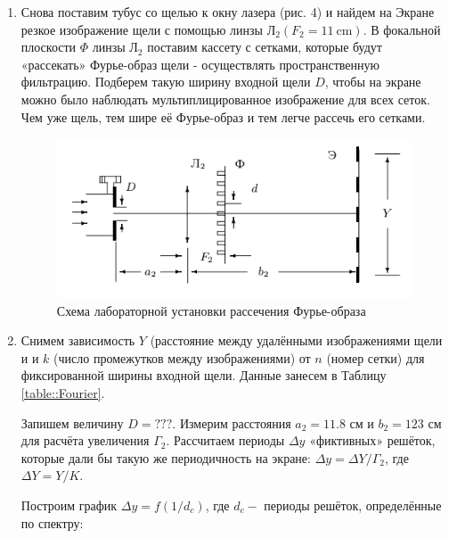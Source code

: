 \documentclass[a4paper, 12pt]{article}
\begin{document}
\begin{enumerate}
    \item Снова поставим тубус со щелью к окну лазера (рис. 4) и найдем на Экране резкое изображение щели с помощью линзы Л$_{2}\left(F_{2} = 11 \mathrm{~cm}\right) .$ В фокальной плоскости $\Phi$ линзы Л$_{2}$ поставим кассету с сетками, которые будут «рассекать» Фурье-образ щели - осуществлять пространственную фильтрацию. Подберем такую ширину входной щели $D$, чтобы на экране можно было наблюдать мультиплицированное изображение для всех сеток. Чем уже щель, тем шире её Фурье-образ и тем легче рассечь его сетками.
    
    \begin{figure}[h]
        \centering
        \includegraphics[width=15cm]{scheme_IV.png}
        \caption{Схема лабораторной установки рассечения Фурье-образа}
        \label{fig:scheme_IV}
    \end{figure}
    
    \newpage
    
    \item Снимем зависимость $Y$ (расстояние между удалёнными изображениями щели и и $k$ (число промежутков между изображениями) от $n$ (номер сетки) для фиксированной ширины входной щели. Данные занесем в Таблицу \ref{table::Fourier}.

    Запишем величину $D = ???$. Измерим расстояния $a_{2} = 11.8$ см и $b_{2} = 123$ см для расчёта увеличения $\Gamma_{2}$. Рассчитаем периоды $\Delta y$ «фиктивных» решёток, которые дали бы такую же периодичность на экране: $\Delta y=\Delta Y / \Gamma_{2}$, где $\Delta Y=Y / K .$

    Построим график $\Delta y=f\left(1 / d_{c}\right)$, где $d_{c}-$ периоды решёток, определённые по спектру:
        

\end{enumerate}
\end{document}
